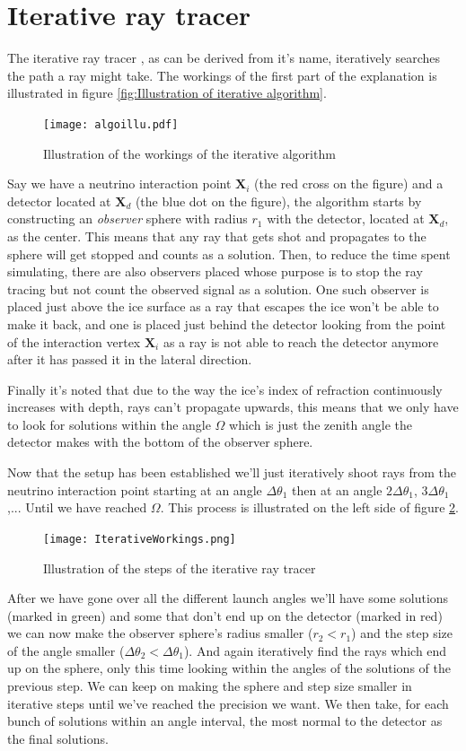 \section{Iterative ray tracer}
\label{sec:Iterative}
The iterative ray tracer \cite{2022icrc.confE1027O}, as can be derived from
it's name, iteratively searches the path a ray might take. The workings of the
first part of the explanation is illustrated in figure \ref{fig:Illustration of
iterative algorithm}.  
\begin{figure}
  \centering
  \texttt{[image: algoillu.pdf]}
  \caption{Illustration of the workings of the iterative algorithm}
  \label{fig:Illustration of iterative algorithm}
\end{figure}
Say we have a neutrino interaction point $\mathbf{X}_i$
(the red cross on the figure) and a detector located at $\mathbf{X}_d$ (the
blue dot on the figure), the algorithm starts by constructing an
\textit{observer} sphere with radius $r_1$ with the detector, located at $\mathbf{X}_d$, as the
center.  This means that any ray that gets shot and propagates to the sphere
will get stopped and counts as a solution.  Then, to reduce the time spent simulating, there are also observers placed
whose purpose is to stop the ray tracing but not count the observed signal as a solution.
One such observer is placed 
just above the ice surface as a ray that escapes the ice won't be able to make it back, and one
is placed just behind the detector looking from the point of the interaction vertex $\mathbf{X}_i$ as
a ray is not able to reach the detector anymore after it has passed it in the
lateral direction. 

Finally it's noted that due to the way the ice's index of refraction
continuously increases with depth, rays can't propagate upwards, this means that we only 
have to look for solutions within the angle $\Omega$ which is just the zenith angle the detector
makes with the bottom of the observer sphere.

Now that the setup has been established we'll just iteratively shoot rays from the neutrino
interaction point starting at an angle $\Delta \theta_1$ then at an angle
$2\Delta \theta_1$, $3\Delta \theta_1$,... Until we have reached $\Omega$. This
process is illustrated on the left side of figure \ref{fig:IterativeWorkings}.
\begin{figure}
  \centering
  \texttt{[image: IterativeWorkings.png]}
  \caption{Illustration of the steps of the iterative ray tracer}
  \label{fig:IterativeWorkings}
\end{figure}
After we have gone over all the different launch angles we'll have some
solutions (marked in green) and some that don't end up on the detector (marked
in red) we can now make the observer sphere's radius smaller ($r_2 < r_1$) and
the step size of the angle smaller ($\Delta \theta_2 < \Delta \theta_1$).  And
again iteratively find the rays which end up on the sphere, only this time
looking within the angles of the solutions of the previous step. We can keep on
making the sphere and step size smaller in iterative steps until we've reached
the precision we want. We then take, for each bunch of solutions within an
angle interval, the most normal to the detector as the final solutions.



